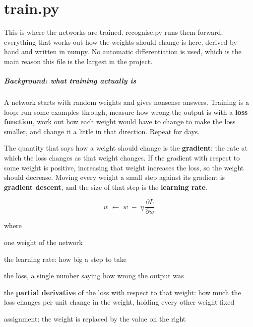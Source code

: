 
\chapter{train.py}
This is where the networks are trained. recognise.py runs them forward; everything that works out how the weights should change is here, derived by hand and written in numpy. No automatic differentiation is used, which is the main reason this file is the largest in the project.


\paragraph{Background: what training actually is}
A network starts with random weights and gives nonsense answers. Training is a loop: run some examples through, measure how wrong the output is with a \textbf{loss function}, work out how each weight would have to change to make the loss smaller, and change it a little in that direction. Repeat for days.

The quantity that says how a weight should change is the \textbf{gradient}: the rate at which the loss changes as that weight changes. If the gradient with respect to some weight is positive, increasing that weight increases the loss, so the weight should decrease. Moving every weight a small step against its gradient is \textbf{gradient descent}, and the size of that step is the \textbf{learning rate}.


\begin{equation}
w \;\leftarrow\; w \;-\; \eta \, \frac{\partial L}{\partial w}
\end{equation}

\noindent where
\begin{description}[leftmargin=2.4em,style=nextline,font=\normalfont\ttfamily]\setlength\itemsep{1pt}
  \item[{$w$}] \normalfont one weight of the network
  \item[{$\eta$}] \normalfont the learning rate: how big a step to take
  \item[{$L$}] \normalfont the loss, a single number saying how wrong the output was
  \item[{$\frac{\partial L}{\partial w}$}] \normalfont the \textbf{partial derivative} of the loss with respect to that weight: how much the loss changes per unit change in the weight, holding every other weight fixed
  \item[{$\leftarrow$}] \normalfont assignment: the weight is replaced by the value on the right
\end{description}

